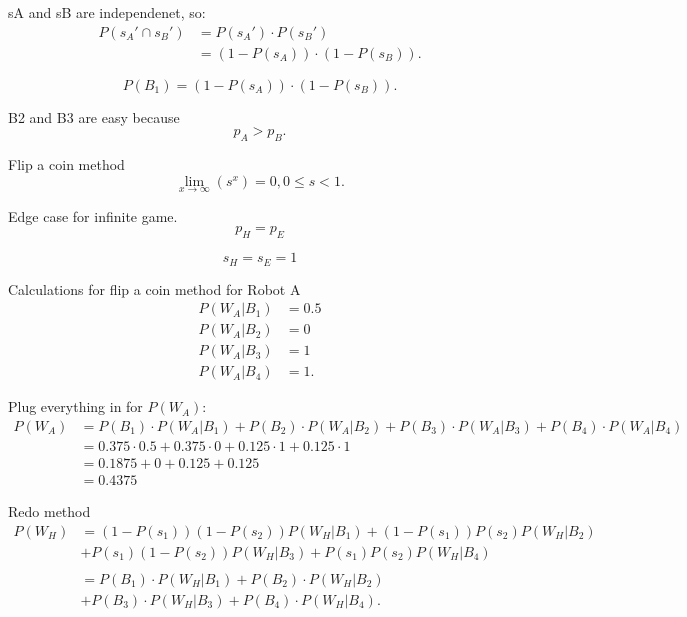 \documentclass[11pt]{article}
\begin{document}
sA and sB are independenet, so:
\begin{align*}
    P(s_A' \cap s_B') &= P(s_A') \cdot P(s_B')\\
    &= (1-P(s_A)) \cdot (1-P(s_B)).
\end{align*}

\begin{equation*}
    P(B_1) = (1-P(s_A)) \cdot (1-P(s_B)).
\end{equation*}

B2 and B3 are easy because
\begin{equation*}
    p_A > p_B.
\end{equation*}


Flip a coin method
\begin{equation*}
    \lim_{x \rightarrow \infty}(s^x) = 0, 0 \leq s < 1.
\end{equation*}

Edge case for infinite game.
\begin{equation*}
    p_H = p_E
\end{equation*}

\begin{equation*}
    s_H = s_E = 1
\end{equation*}

Calculations for flip a coin method for Robot A
\begin{align*}
    P(W_A | B_1) &= 0.5\\
    P(W_A | B_2) &= 0\\
    P(W_A | B_3) &= 1\\
    P(W_A | B_4) &= 1.
\end{align*}

Plug everything in for \(P(W_A)\):
\begin{align*}
    P(W_A) &= P(B_1) \cdot P(W_A | B_1) + P(B_2) \cdot P(W_A | B_2) + P(B_3) \cdot P(W_A | B_3) + P(B_4) \cdot P(W_A | B_4)\\
    &= 0.375 \cdot 0.5 + 0.375 \cdot 0 + 0.125 \cdot 1 + 0.125 \cdot 1\\ 
    &= 0.1875 + 0 + 0.125 + 0.125\\
    &= 0.4375
\end{align*}



Redo method
\begin{align*}
    P(W_{H})&= (1-P(s_1))(1-P(s_2))P(W_H | B_1) + (1-P(s_1))P(s_2)P(W_H | B_2)\\
    &+ P(s_1)(1-P(s_2))P(W_H | B_3) + P(s_1)P(s_2)P(W_H | B_4)\\
    \\
    &= P(B_{1}) \cdot P(W_{H} | B_{1}) + P(B_{2}) \cdot P(W_{H} | B_{2}) \\
    &+ P(B_{3}) \cdot P(W_{H} | B_{3}) + P(B_{4}) \cdot P(W_{H} | B_{4}).
\end{align*}
\end{document}
